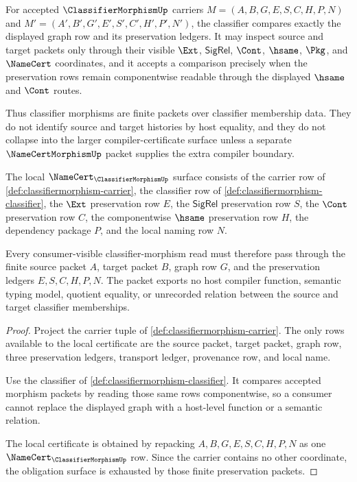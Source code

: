 \begin{definition}
\label{def:classifiermorphism-classifier}
For accepted $\ClassifierMorphismUp$ carriers $M=(A,B,G,E,S,C,H,P,N)$ and $M'=(A',B',G',E',S',C',H',P',N')$, the classifier compares exactly the displayed graph row and its preservation ledgers. It may inspect source and target packets only through their visible $\Ext$, $\mathsf{SigRel}$, $\Cont$, $\hsame$, $\Pkg$, and $\NameCert$ coordinates, and it accepts a comparison precisely when the preservation rows remain componentwise readable through the displayed $\hsame$ and $\Cont$ routes.

Thus classifier morphisms are finite packets over classifier membership data. They do not identify source and target histories by host equality, and they do not collapse into the larger compiler-certificate surface unless a separate $\NameCertMorphismUp$ packet supplies the extra compiler boundary.
\end{definition}

\begin{theorem}
\label{thm:classifiermorphism-namecert-obligation-surface}
The local $\NameCert_{\ClassifierMorphismUp}$ surface consists of the carrier row of \autoref{def:classifiermorphism-carrier}, the classifier row of \autoref{def:classifiermorphism-classifier}, the $\Ext$ preservation row $E$, the $\mathsf{SigRel}$ preservation row $S$, the $\Cont$ preservation row $C$, the componentwise $\hsame$ preservation row $H$, the dependency package $P$, and the local naming row $N$.

Every consumer-visible classifier-morphism read must therefore pass through the finite source packet $A$, target packet $B$, graph row $G$, and the preservation ledgers $E,S,C,H,P,N$. The packet exports no host compiler function, semantic typing model, quotient equality, or unrecorded relation between the source and target classifier memberships.
\end{theorem}
\begin{proof}
Project the carrier tuple of \autoref{def:classifiermorphism-carrier}. The only rows available to the local certificate are the source packet, target packet, graph row, three preservation ledgers, transport ledger, provenance row, and local name.

Use the classifier of \autoref{def:classifiermorphism-classifier}. It compares accepted morphism packets by reading those same rows componentwise, so a consumer cannot replace the displayed graph with a host-level function or a semantic relation.

The local certificate is obtained by repacking $A,B,G,E,S,C,H,P,N$ as one $\NameCert_{\ClassifierMorphismUp}$ row. Since the carrier contains no other coordinate, the obligation surface is exhausted by those finite preservation packets.
\end{proof}


